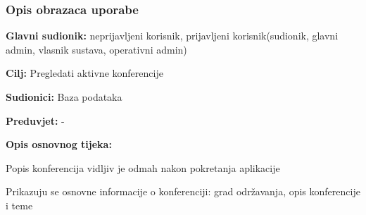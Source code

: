 				
				\subsubsection{Opis obrazaca uporabe}
			
									\noindent {}
					\begin{packed_item}

                            
						\item \textbf{Glavni sudionik: }neprijavljeni korisnik, prijavljeni korisnik(sudionik, glavni admin, vlasnik sustava, operativni admin)
						\item  \textbf{Cilj:} Pregledati aktivne konferencije
						\item  \textbf{Sudionici:} Baza podataka
						\item  \textbf{Preduvjet:} -
						\item  \textbf{Opis osnovnog tijeka:}
						
						\item[] \begin{packed_enum}
	
							\item Popis konferencija vidljiv je odmah nakon pokretanja aplikacije
							\item Prikazuju se osnovne informacije o konferenciji: grad održavanja, opis konferencije i teme
						\end{packed_enum}
					\end{packed_item}


